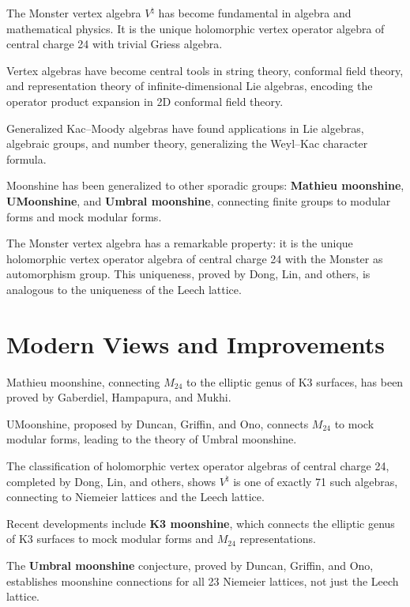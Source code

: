 The Monster vertex algebra $V^{\natural}$ has become fundamental in
algebra and mathematical physics.  It is the unique holomorphic
vertex operator algebra of central charge 24 with trivial Griess
algebra.

Vertex algebras have become central tools in string theory,
conformal field theory, and representation theory of
infinite-dimensional Lie algebras, encoding the operator product
expansion in 2D conformal field theory.

Generalized Kac--Moody algebras have found applications in Lie
algebras, algebraic groups, and number theory, generalizing the
Weyl--Kac character formula.

Moonshine has been generalized to other sporadic groups:
\textbf{Mathieu moonshine}, \textbf{UMoonshine}, and
\textbf{Umbral moonshine}, connecting finite groups to modular forms
and mock modular forms.

The Monster vertex algebra has a remarkable property: it is the
unique holomorphic vertex operator algebra of central charge 24
with the Monster as automorphism group.  This uniqueness, proved by
Dong, Lin, and others, is analogous to the uniqueness of the Leech
lattice.

\section{Modern Views and Improvements}

Mathieu moonshine, connecting $M_{24}$ to the elliptic genus of K3
surfaces, has been proved by Gaberdiel, Hampapura, and Mukhi.

UMoonshine, proposed by Duncan, Griffin, and Ono, connects $M_{24}$
to mock modular forms, leading to the theory of Umbral moonshine.

The classification of holomorphic vertex operator algebras of
central charge 24, completed by Dong, Lin, and others, shows
$V^{\natural}$ is one of exactly 71 such algebras, connecting to
Niemeier lattices and the Leech lattice.

Recent developments include \textbf{K3 moonshine}, which connects
the elliptic genus of K3 surfaces to mock modular forms and
$M_{24}$ representations.

The \textbf{Umbral moonshine} conjecture, proved by Duncan, Griffin,
and Ono, establishes moonshine connections for all 23 Niemeier
lattices, not just the Leech lattice.

